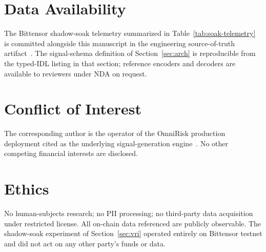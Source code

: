 \documentclass[journal]{IEEEtran}
\let\oldbibliography
\renewcommand{}[1]{%
  \begingroup
  \sloppy
  \raggedright
  \setlength{\emergencystretch}{6em}%
  \oldbibliography{#1}%
  \endgroup
}
\begin{document}
\section*{Data Availability}

The Bittensor shadow-soak telemetry summarized in
Table~\ref{tab:soak-telemetry} is committed alongside this manuscript
in the engineering source-of-truth
artifact~\cite{omnirisk2026soak}. The signal-schema definition of
Section~\ref{sec:arch} is reproducible from the typed-IDL listing in
that section; reference encoders and decoders are available to
reviewers under NDA on request.

\section*{Conflict of Interest}

The corresponding author is the operator of the OmniRisk production
deployment cited as the underlying signal-generation
engine~\cite{omnirisk2026agentic,omnirisk2026predmetrics}. No other
competing financial interests are disclosed.

\section*{Ethics}

No human-subjects research; no PII processing; no third-party data
acquisition under restricted license. All on-chain data referenced are
publicly observable. The shadow-soak experiment of Section~\ref{sec:vri}
operated entirely on Bittensor testnet and did not act on any other
party's funds or data.






\end{document}
